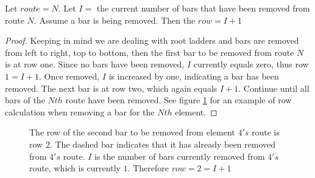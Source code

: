 \begin{lemma}
  Let $route=N$. Let $I=$ the current number of bars that have been removed from route $N$. Assume a bar is being removed. 
  Then the $row=I+1$
\end{lemma}
\begin{proof}
  Keeping in mind we are dealing with root ladders and bars are removed from left to right, top to bottom, then the first bar to 
  be removed from route $N$ is at row one. Since no bars have been removed, $I$ currently equals zero, 
  thus row $1=I+1$. Once removed, $I$ is increased by one, indicating a bar has been removed. The next bar is at row two, 
  which again equals $I+1$. Continue until all bars of the $Nth$ route have been removed. See figure \ref{fig:SJTcase3} for an example 
  of row calculation when removing a bar for the $Nth$ element.
\end{proof}
\begin{figure}[!htp]
  \begin{center}
  \end{center}
  \caption{The row of the second bar to be removed from element $4's$ route is row $2$. The dashed bar indicates that it has already been 
  removed from $4's$ route. $I$ is the number of bars currently removed from $4's$ route, which is currently $1$. Therefore $row=2=I+1$}
  \label{fig:SJTcase3}
\end{figure}



